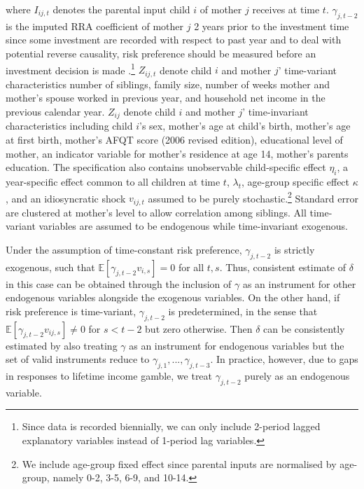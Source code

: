 \documentclass[emulatestandardclasses, 10pt, abstract = true]{scrartcl}
\begin{document}
where $I_{ij,t}$ denotes the parental input child $i$ of mother $j$ receives at time $t$. $\gamma_{j,t-2}$ is the imputed RRA coefficient of mother $j$ 2 years prior to the investment time since some investment are recorded with respect to past year and to deal with potential reverse causality, risk preference should be measured before an investment decision is made \citet{hartog2002linking}.\footnote{Since data is recorded biennially, we can only include 2-period lagged explanatory variables instead of 1-period lag variables.} $Z_{ij,t}$ denote child $i$ and mother $j$' time-variant characteristics number of siblings, family size, number of weeks mother and mother's spouse worked in previous year, and household net income in the previous calendar year. $Z_{ij}$ denote child $i$ and mother $j$' time-invariant characteristics including child $i$'s sex, mother's age at child's birth, mother's age at first birth, mother's AFQT score (2006 revised edition), educational level of mother, an indicator variable for mother's residence at age 14, mother's parents education. The specification also contains unobservable child-specific effect $\eta_i$, a year-specific effect common to all children at time $t$, $\lambda_t$, age-group specific effect $\kappa$, and an idiosyncratic shock $v_{ij,t}$ assumed to be purely stochastic.\footnote{We include age-group fixed effect since parental inputs are normalised by age-group, namely 0-2, 3-5, 6-9, and 10-14.} Standard error are clustered at mother's level to allow correlation among siblings. All time-variant variables are assumed to be endogenous while time-invariant exogenous.

Under the assumption of time-constant risk preference, $\gamma_{j,t-2}$ is strictly exogenous, such that $\mathbb E[\gamma_{j,t-2}v_{i,s}]=0$ for all $t,s$. Thus, consistent estimate of $\delta$ in this case can be obtained through the inclusion of $\gamma$ as an instrument for other endogenous variables alongside the exogenous variables. On the other hand, if risk preference is time-variant, $\gamma_{j,t-2}$ is predetermined, in the sense that $\mathbb E[\gamma_{j,t-2}v_{ij,s}]\ne 0$ for $s<t-2$ but zero otherwise. Then $\delta$ can be consistently estimated by also treating $\gamma$ as an instrument for endogenous variables but the set of valid instruments reduce to $\gamma_{j,1},...,\gamma_{j,t-3}$. In practice, however, due to gaps in responses to lifetime income gamble, we treat $\gamma_{j,t-2}$ purely as an endogenous variable.
\end{document}
